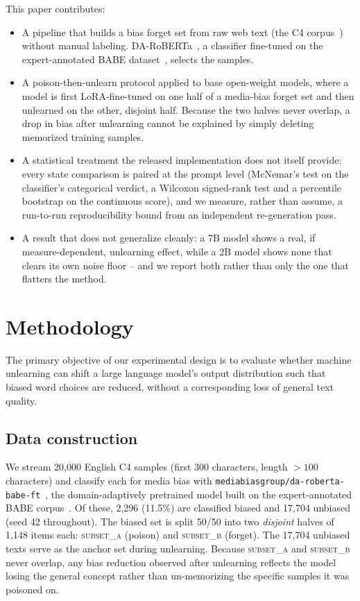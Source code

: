 \documentclass[runningheads]{llncs}
\begin{document}
This paper contributes:
\begin{itemize}
  \item A pipeline that builds a bias forget set from raw web text (the
  C4 corpus~\cite{raffel2020exploring}) without manual labeling.
  DA-RoBERTa~\cite{krieger2022domain}, a classifier fine-tuned on the
  expert-annotated BABE dataset~\cite{spinde-etal-2021-neural-media}, selects the
  samples.
  \item A poison-then-unlearn protocol applied to base open-weight
  models, where a model is first LoRA-fine-tuned on
  one half of a media-bias forget set and then unlearned on the other,
  disjoint half. Because the two halves never overlap, a drop in bias
  after unlearning cannot be explained by simply deleting memorized
  training samples.
  \item A statistical treatment the released implementation does not
  itself provide: every state comparison is paired at the prompt level
  (McNemar's test on the classifier's categorical verdict, a Wilcoxon
  signed-rank test and a percentile bootstrap on the continuous score),
  and we measure, rather than assume, a run-to-run reproducibility
  bound from an independent re-generation pass.
  \item A result that does not generalize cleanly: a 7B model shows a
  real, if measure-dependent, unlearning effect, while a 2B model shows
  none that clears its own noise floor -- and we report both rather
  than only the one that flatters the method.
\end{itemize}



\section{Methodology}
\label{sec:methodology}
The primary objective of our experimental design is to evaluate whether machine unlearning can shift a large language model's output distribution such that biased word choices are reduced, without a corresponding loss of general text quality.

\subsection{Data construction}
We stream 20{,}000 English C4 samples (first 300 characters, length $>100$ characters) and classify each for media bias with \texttt{mediabiasgroup/da-roberta-babe-ft}~\cite{krieger2022domain}, the domain-adaptively pretrained model built on the expert-annotated BABE corpus~\cite{spinde-etal-2021-neural-media}. Of these, 2{,}296 (11.5\%) are classified biased and 17{,}704 unbiased (seed 42 throughout). The biased set is split 50/50 into two \emph{disjoint} halves of 1{,}148 items each: \textsc{subset\_a} (poison) and \textsc{subset\_b} (forget). The 17{,}704 unbiased texts serve as the anchor set during unlearning. Because \textsc{subset\_a} and \textsc{subset\_b} never overlap, any bias reduction observed after unlearning reflects the model losing the general concept rather than un-memorizing the specific samples it was poisoned on.
\end{document}
